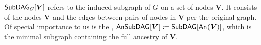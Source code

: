 {$\subgraph[G]{\bm{V}}$ refers to the induced subgraph of $G$ on a set of nodes $\bm{V}$. It consists of the nodes $\bm{V}$ and the edges between pairs of nodes in $\bm{V}$ per the original graph. Of special importance to us is the %
, $\ansubgraph{\bm{V}}\coloneqq\subgraph{\An{\bm{V}}}$, which is the minimal subgraph containing the full ancestry of $\bm{V}$. 








}
